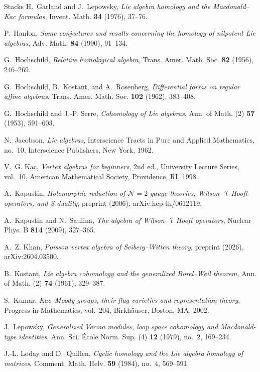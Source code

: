 \documentclass[11pt]{amsart}
\numberwithin{equation}{section}
\theoremstyle{definition}
\theoremstyle{remark}
\begin{document}
\begin{thebibliography}{Stacks}
H.~Garland and J.~Lepowsky, \emph{Lie algebra homology and the Macdonald--Kac formulas}, Invent. Math. \textbf{34} (1976), 37--76.

P.~Hanlon, \emph{Some conjectures and results concerning the homology of nilpotent Lie algebras}, Adv. Math. \textbf{84} (1990), 91--134.

G.~Hochschild, \emph{Relative homological algebra}, Trans. Amer. Math. Soc. \textbf{82} (1956), 246--269.

G.~Hochschild, B.~Kostant, and A.~Rosenberg, \emph{Differential forms on regular affine algebras}, Trans. Amer. Math. Soc. \textbf{102} (1962), 383--408.

G.~Hochschild and J.-P. Serre, \emph{Cohomology of Lie algebras}, Ann. of Math. (2) \textbf{57} (1953), 591--603.

N.~Jacobson, \emph{Lie algebras}, Interscience Tracts in Pure and Applied Mathematics, no.~10, Interscience Publishers, New York, 1962.

V.~G. Kac, \emph{Vertex algebras for beginners}, 2nd ed., University Lecture Series, vol.~10, American Mathematical Society, Providence, RI, 1998.

A.~Kapustin, \emph{Holomorphic reduction of $\mathcal N=2$ gauge theories, Wilson--'t~Hooft operators, and S-duality}, preprint (2006), arXiv:hep-th/0612119.

A.~Kapustin and N.~Saulina, \emph{The algebra of Wilson--'t~Hooft operators}, Nuclear Phys. B \textbf{814} (2009), 327--365.

A.~Z. Khan, \emph{Poisson vertex algebra of Seiberg--Witten theory}, preprint (2026), arXiv:2604.03500.

B.~Kostant, \emph{Lie algebra cohomology and the generalized Borel--Weil theorem}, Ann. of Math. (2) \textbf{74} (1961), 329--387.

S.~Kumar, \emph{Kac--Moody groups, their flag varieties and representation theory}, Progress in Mathematics, vol.~204, Birkh\"auser, Boston, MA, 2002.

J.~Lepowsky, \emph{Generalized Verma modules, loop space cohomology and Macdonald-type identities}, Ann. Sci. \'Ecole Norm. Sup. (4) \textbf{12} (1979), no.~2, 169--234.

J.-L. Loday and D.~Quillen, \emph{Cyclic homology and the Lie algebra homology of matrices}, Comment. Math. Helv. \textbf{59} (1984), no.~4, 569--591.


\end{thebibliography}
\end{document}
